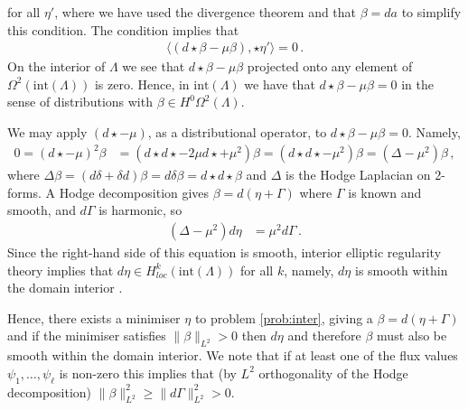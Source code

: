 \documentclass[11pt]{article}
\theoremstyle{plain}
\theoremstyle{definition}
\theoremstyle{remark}
\newcommand{\ST}{\Lambda}
\begin{document}
for all \(\eta'\), where we have used the divergence theorem and that \(\beta = da\) to simplify this condition. The condition implies that
\begin{align*}
    \langle   (d\star \beta  - \mu \beta )   , \star \eta' \rangle = 0 \, . 
\end{align*}
On the interior of \(\ST\) we see that \( d\star \beta  - \mu \beta \) projected onto any element of \(\Omega^2( \text{int} (\ST ))\) is zero. Hence, in \(\text{int} (\ST)\) we have that \( d\star \beta  - \mu \beta  = 0\) in the sense of distributions with \(\beta \in H^0 \Omega^2 (\ST)\). 

We may apply \((d\star   - \mu   )\), as a distributional operator, to \( d\star \beta  - \mu \beta  = 0\). Namely,
\begin{align*}
    0 = (d\star   - \mu   )^2 \beta &= (d\star d \star   - 2 \mu d\star + \mu^2   ) \beta =  (d\star d \star   -  \mu^2   ) \beta = (\Delta - \mu^2 ) \beta  \, ,
\end{align*}
where \(\Delta \beta = (d \delta + \delta d) \beta = d \delta \beta= d \star d \star  \beta \) and \(\Delta\) is the Hodge Laplacian on 2-forms. A Hodge decomposition gives \(\beta = d ( \eta + \Gamma) \) where \(\Gamma\) is known and smooth, and \(d \Gamma \) is harmonic, so
\begin{align*}
    (\Delta - \mu^2 ) d \eta &=  \mu^2   d \Gamma \, . 
\end{align*}
Since the right-hand side of this equation is smooth, interior elliptic regularity theory implies that \(d \eta \in H^k_{loc} (  \text{int}(\ST)  )\) for all \(k\), namely, \(d \eta \) is smooth within the domain interior \cite{gilbarg1998elliptic}. 



Hence, there exists a minimiser \(\eta\) to problem \eqref{prob:inter}, giving a \(\beta = d (\eta + \Gamma)\) and if the minimiser satisfies \(\| \beta \|_{L^2} > 0 \) then \(d \eta\) and therefore \(\beta\) must also be smooth within the domain interior. We note that if at least one of the flux values \(\psi_1, \dots, \psi_\ell\) is non-zero this implies that (by \(L^2\) orthogonality of the Hodge decomposition) \(\| \beta \|_{L^2}^2 \geq \|d \Gamma \|_{L^2}^2 > 0\). 
\end{document}
